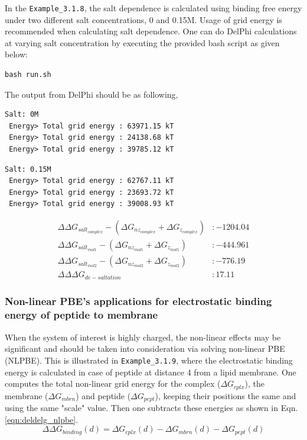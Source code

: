 \documentclass[9pt,tutorial,pubversion]{livecoms}
\newcommand*\ttvar[1]{\texttt{\expandafter\dottvar\detokenize{#1}\relax}}
\newcommand*\dottvar[1]{\ifx\relax#1\else
  \expandafter\ifx\string_#1\string_\allowbreak\else#1\fi
  \expandafter\dottvar\fi}
\begin{document}
In the \texttt{Example\_3.1.8}, the salt dependence is calculated using binding free energy under two different salt concentrations, 0 and 0.15M. Usage of grid energy is recommended when calculating salt dependence. One can do DelPhi calculations at varying salt concentration by executing the provided bash script \ttvar{run.sh} as given below:

\begin{verbatim}
bash run.sh
\end{verbatim}

The output from DelPhi should be as following,

\begin{verbatim}
Salt: 0M 
 Energy> Total grid energy : 63971.15 kT
 Energy> Total grid energy : 24138.68 kT
 Energy> Total grid energy : 39785.12 kT
\end{verbatim}

\begin{verbatim}
Salt: 0.15M
 Energy> Total grid energy : 62767.11 kT
 Energy> Total grid energy : 23693.72 kT
 Energy> Total grid energy : 39008.93 kT
\end{verbatim}

\begin{equation}
\begin{aligned}
\Delta \Delta G_{salt_{complex}} - (\Delta G_{nz_{complex}} + \Delta G_{z_{complex}}) &: -1204.04 \nonumber \\
\Delta\Delta G_{salt_{mol1}} - (\Delta G_{nz_{mol1}} + \Delta G_{z_{mol1}}) &: -444.961 \nonumber \\
\Delta\Delta G_{salt_{mol2}} - (\Delta G_{nz_{mol2}} + \Delta G_{z_{mol2}}) &: -776.19 \nonumber \\
\Delta\Delta\Delta G_{de-saltation} &: 17.11 \nonumber 
\end{aligned}
\end{equation}

\subsubsection{Non-linear PBE's applications for electrostatic binding energy of peptide to membrane}
When the system of interest is highly charged, the non-linear effects may be significant and should be taken into consideration via solving non-linear PBE (NLPBE). This is illustrated in \texttt{Example\_3.1.9}, where the electrostatic binding energy is calculated in case of peptide at distance 4 \text{\AA} from a lipid membrane. One computes the total non-linear grid energy for the complex ($ \Delta G_{cplx}$), the membrane ($ \Delta G_{mbrn}$) and peptide ($ \Delta G_{pept} $), keeping their positions the same and using the same "scale" value. Then one subtracts these energies as shown in Eqn. \ref{eqn:deldelg_nlpbe}.
\begin{equation}\label{eqn:deldelg_nlpbe}
\Delta\Delta G_{binding}(d) = \Delta G_{cplx}(d) - \Delta G_{mbrn}(d) - \Delta G_{pept}(d)
\end{equation}
\end{document}
